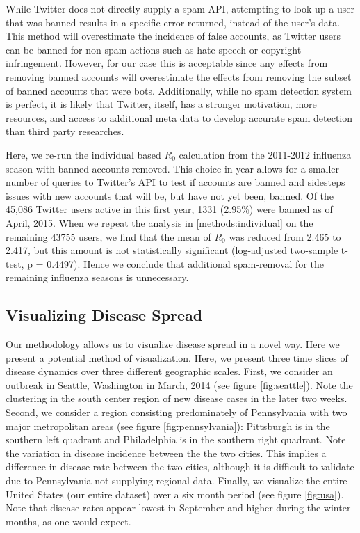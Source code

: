 While Twitter does not directly supply a spam-API, attempting to look up a user that was banned results in a specific error returned, instead of the user's data. This method will overestimate the incidence of false accounts, as Twitter users can be banned for non-spam actions such as hate speech or copyright infringement. However, for our case this is acceptable since any effects from removing banned accounts will overestimate the effects from removing the subset of banned accounts that were bots. Additionally, while no spam detection system is perfect, it is likely that Twitter, itself, has a stronger motivation, more resources, and access to additional meta data to develop accurate spam detection than third party researches.

Here, we re-run the individual based \(R_0\) calculation from the 2011-2012 influenza season with banned accounts removed. This choice in year allows for a smaller number of queries to Twitter's API to test if accounts are banned and sidesteps issues with new accounts that will be, but have not yet been, banned. Of the 45,086 Twitter users active in this first year, 1331 (2.95\%) were banned as of April, 2015. When we repeat the analysis in \ref{methods:individual} on the remaining 43755 users, we find that the mean of \(R_0\) was reduced from 2.465 to 2.417, but this amount is not statistically significant (log-adjusted two-sample t-test, p = 0.4497). Hence we conclude that additional spam-removal for the remaining influenza seasons is unnecessary.

\subsection{Visualizing Disease Spread}

Our methodology allows us to visualize disease spread in a novel way. Here we present a potential method of visualization. Here, we present three time slices of disease dynamics over three different geographic scales.  First, we consider an outbreak in Seattle, Washington in March, 2014 (see figure \ref{fig:seattle}). Note the clustering in the south center region of new disease cases in the later two weeks. Second, we consider a region consisting predominately of Pennsylvania with two major metropolitan areas (see figure \ref{fig:pennsylvania}): Pittsburgh is in the southern left quadrant and Philadelphia is in the southern right quadrant. Note the variation in disease incidence between the the two cities. This implies a difference in disease rate between the two cities, although it is difficult to validate due to Pennsylvania not supplying regional data. Finally, we visualize the entire United States (our entire dataset) over a six month period (see figure \ref{fig:usa}). Note that disease rates appear lowest in September and higher during the winter months, as one would expect. %

